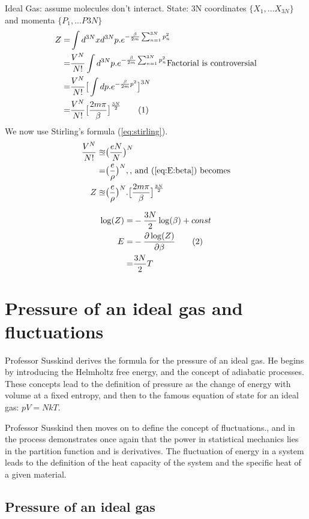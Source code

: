 \documentclass[]{article}
\newcommand\numberthis{\addtocounter{equation}{1}\tag{\theequation}}
\begin{document}
Ideal Gas: assume molecules don't interact.
State: 3N coordinates $\{X_1,...X_{3N}\}$ and momenta $\{P_1,...P3N\}$
\begin{align*}
Z =& \int d^{3N}x d^{3N}p . e^{- \frac{\beta}{2m} \sum_{n=1}^{3N} p_n^2}\\
=& \frac{V^N}{N!} \int d^{3N}p . e^{- \frac{\beta}{2m} \sum_{n=1}^{3N} p_n^2}\text{Factorial is controversial}\\
=& \frac{V^N}{N!} \big[\int dp. e^{-\frac{\beta}{2m}p^2}\big]^{3N}\\
=& \frac{V^N}{N!} \big[\frac{2 m \pi}{\beta}\big]^{\frac{3N}{2}}\numberthis\label{eq:Z_beta}
\end{align*}
We now use Stirling's formula (\ref{eq:stirling}).
\begin{align*}
\frac{V^N}{N!} \approxeq& \big(\frac{eN}{N}\big)^N \\
=& \big(\frac{e}{\rho}\big)^N,\text{, and (\ref{eq:E:beta}) becomes}\\
Z \approxeq& \big(\frac{e}{\rho}\big)^N .  \big[\frac{2 m \pi}{\beta}\big]^{\frac{3N}{2}}
\end{align*}

\begin{align*}
\log(Z) =& - \frac{3N}{2} \log(\beta) + const\\
E =& - \frac{\partial \log(Z)}{\partial \beta}\numberthis \label{eq:E:Z}\\
=& \frac{3N}{2} T
\end{align*}


\section{Pressure of an ideal gas and fluctuations}

Professor Susskind derives the formula for the pressure of an ideal gas.  He begins by introducing the Helmholtz free energy, and the concept of adiabatic processes.  These concepts lead to the definition of pressure as the change of energy with volume at a fixed entropy, and then to the famous equation of state for an ideal gas:  $pV = NkT$.

Professor Susskind then moves on to define the concept of fluctuations., and in the process demonstrates once again that the power in statistical mechanics lies in the partition function and is derivatives.  The fluctuation of energy in a system leads to the definition of the heat capacity of the system and the specific heat of a given material.

\subsection{Pressure of an ideal gas}
\end{document}
